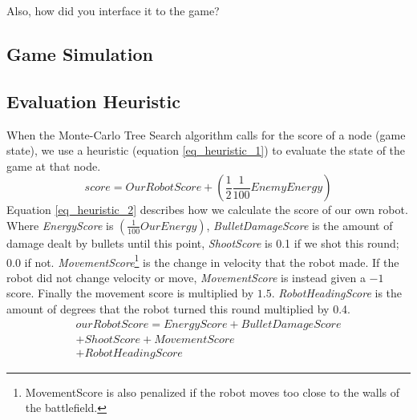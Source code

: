 Also, how did you interface it to the game?




\subsection{Game Simulation}


\subsection{Evaluation Heuristic}
When the Monte-Carlo Tree Search algorithm calls for the score of a node (game state), we use a heuristic (equation \ref{eq_heuristic_1}) to evaluate the state of the game at that node. 
\begin{equation}
\label{eq_heuristic_1}
score = OurRobotScore +  (\frac{1}{2} \frac{1}{100} EnemyEnergy)
\end{equation}
Equation \ref{eq_heuristic_2} describes how we calculate the score of our own robot.
\\Where \textit{EnergyScore} is $(\frac{1}{100}OurEnergy)$, \textit{BulletDamageScore} is the amount of damage dealt by bullets until this point, \textit{ShootScore} is 0.1 if we shot this round; 0.0 if not. \textit{MovementScore}\footnote{MovementScore is also penalized if the robot moves too close to the walls of the battlefield.} is the change in velocity that the robot made. If the robot did not change velocity or move, \textit{MovementScore} is instead given a $-1$ score. Finally the movement score is multiplied by $1.5$. \textit{RobotHeadingScore} is the amount of degrees that the robot turned this round multiplied by 0.4.
\begin{equation}
\begin{split}
\label{eq_heuristic_2}
ourRobotScore = EnergyScore+BulletDamageScore\\
+ShootScore+MovementScore\\
+RobotHeadingScore
\end{split}
\end{equation}
